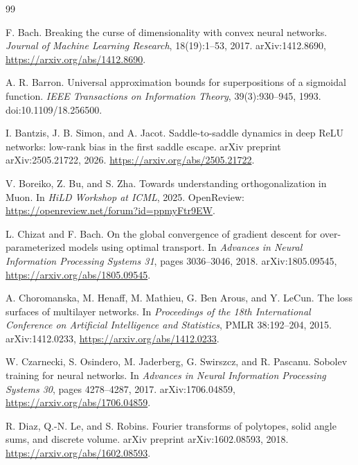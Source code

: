 \documentclass{article}
\begin{document}
\fi
\begin{thebibliography}{99}

F. Bach.
\newblock Breaking the curse of dimensionality with convex neural networks.
\newblock \emph{Journal of Machine Learning Research}, 18(19):1--53, 2017.
\newblock arXiv:1412.8690, \url{https://arxiv.org/abs/1412.8690}.

A. R. Barron.
\newblock Universal approximation bounds for superpositions of a sigmoidal function.
\newblock \emph{IEEE Transactions on Information Theory}, 39(3):930--945, 1993.
\newblock doi:10.1109/18.256500.

I. Bantzis, J. B. Simon, and A. Jacot.
\newblock Saddle-to-saddle dynamics in deep {ReLU} networks: low-rank bias in the first saddle escape.
\newblock arXiv preprint arXiv:2505.21722, 2026.
\newblock \url{https://arxiv.org/abs/2505.21722}.

V. Boreiko, Z. Bu, and S. Zha.
\newblock Towards understanding orthogonalization in Muon.
\newblock In \emph{HiLD Workshop at ICML}, 2025.
\newblock OpenReview: \url{https://openreview.net/forum?id=ppmyFtr9EW}.

L. Chizat and F. Bach.
\newblock On the global convergence of gradient descent for over-parameterized models using optimal transport.
\newblock In \emph{Advances in Neural Information Processing Systems 31}, pages 3036--3046, 2018.
\newblock arXiv:1805.09545, \url{https://arxiv.org/abs/1805.09545}.

A. Choromanska, M. Henaff, M. Mathieu, G. Ben Arous, and Y. LeCun.
\newblock The loss surfaces of multilayer networks.
\newblock In \emph{Proceedings of the 18th International Conference on Artificial Intelligence and Statistics}, PMLR 38:192--204, 2015.
\newblock arXiv:1412.0233, \url{https://arxiv.org/abs/1412.0233}.

W. Czarnecki, S. Osindero, M. Jaderberg, G. Swirszcz, and R. Pascanu.
\newblock Sobolev training for neural networks.
\newblock In \emph{Advances in Neural Information Processing Systems 30}, pages 4278--4287, 2017.
\newblock arXiv:1706.04859, \url{https://arxiv.org/abs/1706.04859}.

R. Diaz, Q.-N. Le, and S. Robins.
\newblock Fourier transforms of polytopes, solid angle sums, and discrete volume.
\newblock arXiv preprint arXiv:1602.08593, 2018.
\newblock \url{https://arxiv.org/abs/1602.08593}.


\end{thebibliography}
\end{document}
